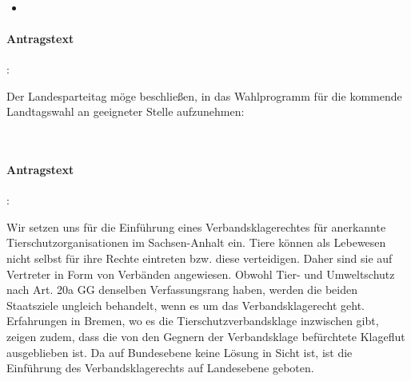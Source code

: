 
\label{wpa:smsnotruf1}
\\
\begin{itemize}
\item {}
\end{itemize}

\paragraph{Antragstext}:

Der Landesparteitag möge beschließen, in das Wahlprogramm für die kommende Landtagswahl an geeigneter Stelle aufzunehmen:




\\

\paragraph{Antragstext}:

Wir setzen uns für die Einführung eines Verbandsklagerechtes für anerkannte Tierschutzorganisationen im Sachsen-Anhalt ein. Tiere können als Lebewesen nicht selbst für ihre Rechte eintreten bzw. diese verteidigen. Daher sind sie auf Vertreter in Form von Verbänden angewiesen. Obwohl Tier- und Umweltschutz nach Art. 20a GG denselben Verfassungsrang haben, werden die beiden Staatsziele ungleich behandelt, wenn es um das Verbandsklagerecht geht. Erfahrungen in Bremen, wo es die Tierschutzverbandsklage inzwischen gibt, zeigen zudem, dass die von den Gegnern der Verbandsklage befürchtete Klageflut ausgeblieben ist. Da auf Bundesebene keine Lösung in Sicht ist, ist die Einführung des Verbandsklagerechts auf Landesebene geboten.

